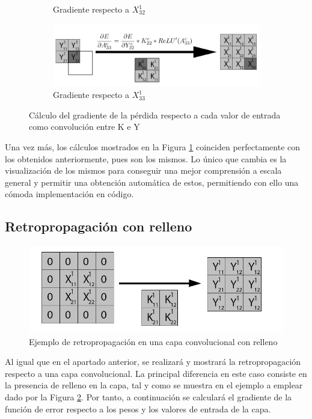 \begin{figure}[H]
\begin{subfigure}{.5\textwidth}
		\caption{Gradiente respecto a $X^1_{32}$}
	\end{subfigure}
		\vspace{5mm}
	\begin{subfigure}{.5\textwidth}
		\hspace{-25mm}
		\includegraphics[width=1.4\linewidth]{imagenes/conv_back_entrada_9.jpg}  
		\caption{Gradiente respecto a $X^1_{33}$}
	\end{subfigure}
	\caption{Cálculo del gradiente de la pérdida respecto a cada valor de entrada como convolución entre K e Y}
	\label{fig:conv_backprop_como_convolucion_Y_W}
\end{figure}

Una vez más, los cálculos mostrados en la Figura \ref{fig:conv_backprop_como_convolucion_Y_W} coinciden perfectamente con los obtenidos anteriormente, pues son los mismos. Lo único que cambia es la visualización de los mismos para conseguir una mejor comprensión a escala general y permitir una obtención automática de estos, permitiendo con ello una cómoda implementación en código.

\subsection{Retropropagación con relleno}

\begin{figure}[H]
	\centering
	\includegraphics[width=0.8\linewidth]{imagenes/conv_back_padding_intro.jpg} 
	\caption{Ejemplo de retropropagación en una capa convolucional con relleno}
	\label{fig:conv_back_padding_intro}
\end{figure}

Al igual que en el apartado anterior, se realizará y mostrará la retropropagación respecto a una capa convolucional. La principal diferencia en este caso consiste en la presencia de relleno en la capa, tal y como se muestra en el ejemplo a emplear dado por la Figura \ref{fig:conv_back_padding_intro}. Por tanto, a continuación se calculará el gradiente de la función de error respecto a los pesos y los valores de entrada de la capa.

